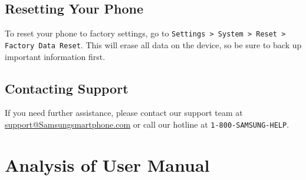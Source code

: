 \documentclass{article}
\begin{document}
\subsection{Resetting Your Phone}
To reset your phone to factory settings, go to \texttt{Settings > System > Reset > Factory Data Reset}. This will erase all data on the device, so be sure to back up important information first.

\subsection{Contacting Support}
If you need further assistance, please contact our support team at \href{mailto:support@Samsungsmartphone.com}{support@Samsungsmartphone.com} or call our hotline at \texttt{1-800-SAMSUNG-HELP}.

\section*{Analysis of User Manual}
\end{document}
